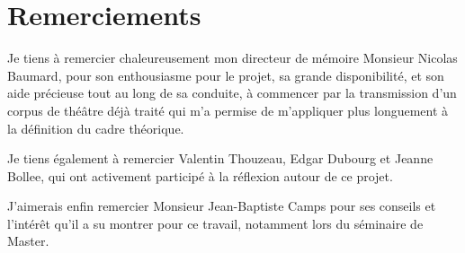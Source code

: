 \chapter*{Remerciements}
\bigskip



Je tiens à remercier chaleureusement mon directeur de mémoire Monsieur Nicolas Baumard, pour son enthousiasme pour le projet, sa grande disponibilité, et son aide précieuse tout au long de sa conduite, à commencer par la transmission d’un corpus de théâtre déjà traité qui m’a permise de m’appliquer plus longuement à la définition du cadre théorique.

Je tiens également à remercier Valentin Thouzeau, Edgar Dubourg et Jeanne Bollee, qui ont activement participé à la réflexion autour de ce projet.

J’aimerais enfin remercier Monsieur Jean-Baptiste Camps pour ses conseils et l’intérêt qu’il a su montrer pour ce travail, notamment lors du séminaire de Master.
